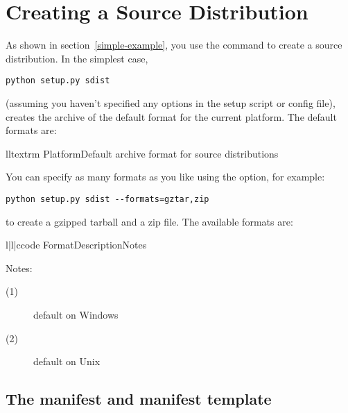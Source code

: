 \documentclass{howto}
\begin{document}


\section{Creating a Source Distribution}
\label{source-dist}

As shown in section~\ref{simple-example}, you use the
 command to create a source distribution.  In the
simplest case,
\begin{verbatim}
python setup.py sdist
\end{verbatim}
(assuming you haven't specified any  options in the setup
script or config file),  creates the archive of the
default format for the current platform.  The default formats are:
\begin{tableii}{ll}{textrm}%
  {Platform}{Default archive format for source distributions}
\end{tableii}
You can specify as many formats as you like using the
 option, for example:
\begin{verbatim}
python setup.py sdist --formats=gztar,zip
\end{verbatim}
to create a gzipped tarball and a zip file.  The available formats are:
\begin{tableiii}{l|l|c}{code}%
  {Format}{Description}{Notes}
\end{tableiii}

\noindent Notes:
\begin{description}
\item[(1)] default on Windows
\item[(2)] default on Unix
\end{description}


\subsection{The manifest and manifest template}
\label{manifest}
\end{document}
